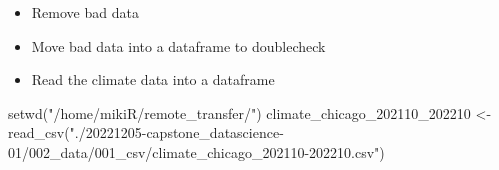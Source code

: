 \documentclass[
]{article}
\newenvironment{Shaded}{\begin{snugshade}}{\end{snugshade}}
\newcommand{\DecValTok}[1]{\textcolor[rgb]{0.00,0.00,0.81}{#1}}
\newcommand{\FunctionTok}[1]{\textcolor[rgb]{0.00,0.00,0.00}{#1}}
\newcommand{\NormalTok}[1]{#1}
\newcommand{\OtherTok}[1]{\textcolor[rgb]{0.56,0.35,0.01}{#1}}
\newcommand{\SpecialCharTok}[1]{\textcolor[rgb]{0.00,0.00,0.00}{#1}}
\newcommand{\StringTok}[1]{\textcolor[rgb]{0.31,0.60,0.02}{#1}}
\providecommand{\tightlist}{%
  \setlength{\itemsep}{0pt}\setlength{\parskip}{0pt}}
\begin{document}
\fontsize{10}{12}
\selectfont

\begin{itemize}
\tightlist
\item
  Remove bad data
\end{itemize}

\fontsize{9}{11}
\selectfont

\begin{Shaded}
\end{Shaded}

\fontsize{10}{12}
\selectfont

\begin{itemize}
\tightlist
\item
  Move bad data into a dataframe to doublecheck
\end{itemize}

\fontsize{9}{11}
\selectfont

\begin{Shaded}
\end{Shaded}

\fontsize{10}{12}
\selectfont

\begin{itemize}
\tightlist
\item
  Read the climate data into a dataframe
\end{itemize}

\fontsize{9}{11}
\selectfont

\begin{Shaded}
\begin{Highlighting}[]
\FunctionTok{setwd}\NormalTok{(}\StringTok{"/home/mikiR/remote\_transfer/"}\NormalTok{)}
\NormalTok{climate\_chicago\_202110\_202210 }\OtherTok{\textless{}{-}} 
  \FunctionTok{read\_csv}\NormalTok{(}\StringTok{"./20221205{-}capstone\_datascience{-}01/002\_data/001\_csv/climate\_chicago\_202110{-}202210.csv"}\NormalTok{)}
\end{Highlighting}
\end{Shaded}
\end{document}
